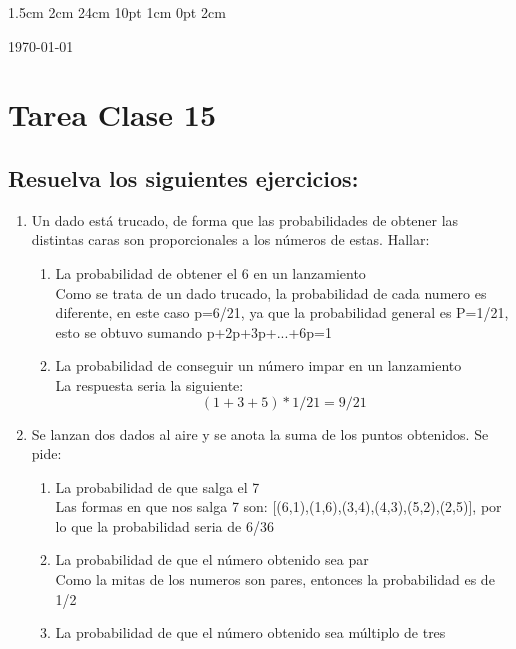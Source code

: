 \documentclass[12pt,letterpaper]{report}
\begin{document}
\setmargins{2.5cm}      
{1.5cm}                     
{2cm}  
{24cm}                    
{10pt}                          
{1cm}                          
{0pt}                             
{2cm}
\begin{flushright}
\today
\end{flushright}
\vspace{-1.75cm}
\section*{Tarea Clase 15}
\subsection*{Resuelva los siguientes ejercicios:}
\begin{enumerate}
    \item  Un dado está trucado, de forma que las probabilidades de obtener las distintas caras son proporcionales a los números de estas. Hallar:
    \begin{enumerate}
    \item La probabilidad de obtener el 6 en un lanzamiento\\
    Como se trata de un dado trucado, la probabilidad de cada numero es diferente, en este caso p=6/21, ya que la probabilidad general es P=1/21, esto se obtuvo sumando p+2p+3p+...+6p=1
    \item La probabilidad de conseguir un número impar en un lanzamiento\\
    La respuesta seria la siguiente:
    \begin{equation*}
        (1+3+5)*1/21= 9/21
    \end{equation*}
    \end{enumerate}
    \item Se lanzan dos dados al aire y se anota la suma de los puntos obtenidos. Se pide:
    \begin{enumerate}
    \item La probabilidad de que salga el 7\\
    Las formas en que nos salga 7 son: [(6,1),(1,6),(3,4),(4,3),(5,2),(2,5)], por lo que la probabilidad seria de 6/36
    \item La probabilidad de que el número obtenido sea par\\
    Como la mitas de los numeros son pares, entonces la probabilidad es de 1/2
    \item La probabilidad de que el número obtenido sea múltiplo de tres\\

\end{enumerate}
\end{enumerate}
\end{document}
